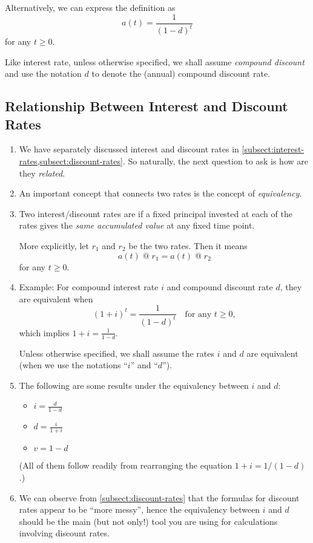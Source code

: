 \begin{enumerate}
\begin{remark}
\item Alternatively, we can express the definition as
\[
a(t)=\frac{1}{(1-d)^{t}}
\]
for any \(t\ge 0\).
\item Like interest rate, unless otherwise specified, we shall assume \emph{compound
discount} and use the notation \(d\) to denote the (annual) compound discount
rate.
\end{remark}
\end{enumerate}
\subsection{Relationship Between Interest and Discount Rates}
\begin{enumerate}
\item We have separately discussed interest and discount rates in
\cref{subsect:interest-rates,subsect:discount-rates}. So naturally, the next
question to ask is how are they \emph{related}.
\item An important concept that connects two rates is the concept of
\emph{equivalency}.
\item Two interest/discount rates are  if a fixed principal
 invested at each of the rates gives the \emph{same
accumulated value} at any fixed time point.

\begin{note}
More explicitly, let \(r_1\) and \(r_2\) be the two rates. Then it means
\[
a(t)\;@\;r_1 = a(t)\;@\;r_2
\]
for any \(t\ge 0\).
\end{note}

\item Example: For compound interest rate \(i\) and compound discount rate
\(d\), they are equivalent when
\[
(1+i)^{t}=\frac{1}{(1-d)^{t}}\quad\text{for any \(t\ge 0\)},
\]
which implies \(\displaystyle 1+i=\frac{1}{1-d}\).

\begin{note}
Unless otherwise specified, we shall assume the rates \(i\) and \(d\) are
equivalent (when we use the notations ``\(i\)'' and ``\(d\)'').
\end{note}

\item \label{it:id-equiv-fmlas}
The following are some results under the equivalency between \(i\) and \(d\):
\begin{itemize}
\item \(\displaystyle i=\frac{d}{1-d}\)
\item \(\displaystyle d=\frac{i}{1+i}\)
\item \(v=1-d\)
\end{itemize}
(All of them follow readily from rearranging the equation \(1+i=1/(1-d)\).)

\item We can observe from \cref{subsect:discount-rates} that the formulas for
discount rates appear to be ``more messy'', hence the equivalency between \(i\)
and \(d\) should be the main (but not only!) tool you are using for
calculations involving discount rates.
\end{enumerate}
